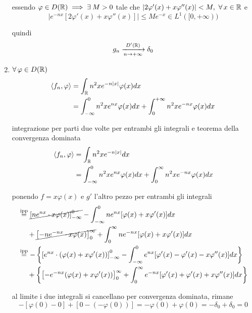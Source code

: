 \begin{enumerate}
essendo $\varphi \in D(\RR) \implies \exists M > 0$ tale che $| 2\varphi '(x) + x\varphi ''(x)| < M,\ \forall x\in \RR $ e\begin{equation*}
\left| e^{ - nx}[ 2\varphi '(x) + x\varphi ''(x)]\right| \leq Me^{ - x} \in L^{1}([ 0, + \infty))
\end{equation*}

quindi\begin{equation*}
g_{n}\xrightarrow[n\rightarrow + \infty ]{D'(\mathbb{R})} \delta _{0}
\end{equation*}
\item $\forall \varphi \in D(\RR)$\begin{equation*}
\begin{aligned}
\langle f_{n} ,\varphi \rangle  & = \int _{\mathbb{R} } n^{2} xe^{ - n| x| } \varphi (x) dx\\
 & = \int ^{0}_{ - \infty } n^{2} xe^{nx} \varphi (x) dx + \int ^{ + \infty }_{0} n^{2} xe^{ - nx} \varphi (x) dx
\end{aligned}
\end{equation*}

integrazione per parti due volte per entrambi gli integrali e teorema della convergenza dominata\begin{align*}
\langle f_{n} ,\varphi \rangle  & = \int _{\mathbb{R} } n^{2} xe^{ - n| x| } dx\\
 & = \int ^{0}_{ - \infty } n^{2} xe^{nx} \varphi (x) dx + \int ^{\infty }_{0} n^{2} xe^{ - nx} \varphi (x) dx
\end{align*}

ponendo $f = x\varphi (x)$ e $g'$ l'altro pezzo per entrambi gli integrali\begin{align*}
 & \overset{\text{ipp}}{ = }\cancel{\left[ ne^{nx} \cdot x\varphi (x)\right]^{0}_{ - \infty }} - \int ^{0}_{ - \infty } ne^{nx}[ \varphi (x) + x\varphi '(x)] dx\\
 & \ \ \ \ + \cancel{\left[ - ne^{ - nx} \cdot x\varphi (x)\right]^{\infty }_{0}} + \int ^{\infty }_{0} ne^{ - nx}[ \varphi (x) + x\varphi '(x)] dx\\
 & \overset{\text{ipp}}{ = } - \left\{\left[ e^{nx} \cdot (\varphi (x) + x\varphi '(x))\right]^{0}_{ - \infty } - \int ^{0}_{ - \infty } e^{nx}[ \varphi '(x) - \varphi '(x) - x\varphi ''(x)] dx\right\}\\
 & \ \ \ \ + \left\{\left[ - e^{ - nx}(\varphi (x) + x\varphi '(x))\right]^{\infty }_{0} + \int ^{\infty }_{0} e^{ - nx}[ \varphi '(x) + \varphi '(x) + x\varphi ''(x)] dx\right\}
\end{align*}

al limite i due integrali si cancellano per convergenza dominata, rimane\begin{equation*}
- [ \varphi (0) - 0] + [ 0 - (- \varphi (0))] = - \varphi (0) + \varphi (0) = - \delta _{0} + \delta _{0} = 0
\end{equation*}
\end{enumerate}
